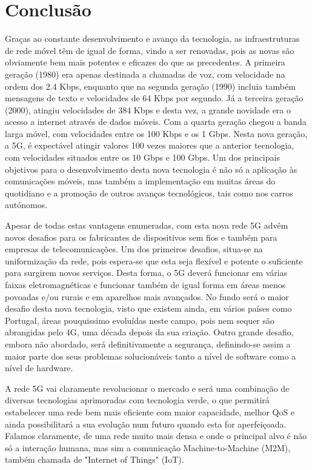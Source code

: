 \documentclass[conference]{IEEEtran}
\begin{document}
\section{Conclusão}
Graças ao constante desenvolvimento e avanço da tecnologia, as infraestruturas de rede móvel têm de igual de forma, vindo a ser renovadas, pois as novas são obviamente bem mais potentes e eficazes do que as precedentes. A primeira geração (1980) era apenas destinada a chamadas de voz, com velocidade na ordem dos 2.4 Kbps, enquanto que na segunda geração (1990) incluia também mensagens de texto e velocidades de 64 Kbps por segundo. Já a terceira geração (2000), atingiu velocidades de 384 Kbps e desta vez, a grande novidade era o acesso a internet através de dados móveis. Com a quarta geração chegou a banda larga móvel, com velocidades entre os 100 Kbps e os 1 Gbps. Nesta nova geração, a 5G, é expectável atingir valores 100 vezes maiores que a anterior tecnologia, com velocidades situados entre os 10 Gbps e 100 Gbps. Um dos principais objetivos para o desenvolvimento desta nova tecnologia é não só a aplicação às comunicações móveis, mas também a implementação em muitas áreas do quotidiano e a promoção de outros avanços tecnológicos, tais como nos carros autónomos.\par
Apesar de todas estas vantagens enumeradas, com esta nova rede 5G advêm novos desafios para os fabricantes de dispositivos sem fios e também para empresas de telecomunicações. Um dos primeiros desafios, situa-se na uniformização da rede, pois espera-se que esta seja flexível e potente o suficiente para surgirem novos serviços. Desta forma, o 5G deverá funcionar em várias faixas eletromagnéticas e funcionar também de igual forma em áreas menos povoadas e/ou rurais e em aparelhos mais avançados. No fundo será o maior desafio desta nova tecnologia, visto que existem ainda, em vários países como Portugal, áreas pouquissimo evoluídas neste campo, pois nem sequer são abrangidas pelo 4G, uma década depois da sua criação. Outro grande desafio, embora não abordado, será definitivamente a segurança, definindo-se assim a maior parte dos seus problemas solucionáveis tanto a nível de software como a nível de hardware.\par
A rede 5G vai claramente revolucionar o mercado e será uma combinação de diversas tecnologias aprimoradas com tecnologia verde, o que permitirá estabelecer uma rede bem mais eficiente com maior capacidade, melhor QoS e ainda possibilitará a sua evolução num futuro quando esta for aperfeiçoada. Falamos claramente, de uma rede muito mais densa e onde o principal alvo é não só a interação humana, mas sim a comunicação Machine-to-Machine (M2M), também chamada de "Internet of Things" (IoT). \par
\end{document}
